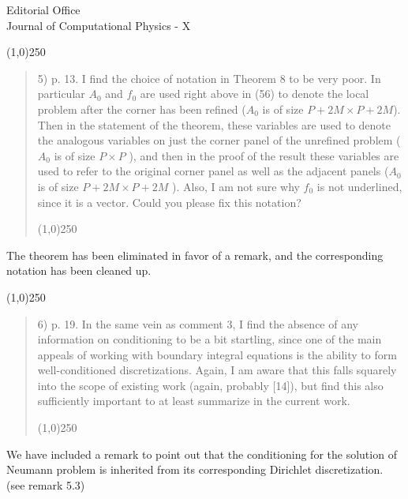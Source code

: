\documentclass[11pt]{letter}
\newcommand\qa{\begin{center}\line(1,0){250}\end{center}\begin{quote}\begin{em}}
\newcommand\qb{\end{em}\begin{center}\line(1,0){250}\end{center}\end{quote}}
\begin{document}
\begin{letter}{Editorial Office\\
Journal of Computational Physics - X}
\qa
5) p. 13. I find the choice of notation in Theorem 8 to be very poor. In particular $A_{0}$ and $f_{0}$ are
used right above in (56) to denote the local problem after the corner has been refined ($A_{0}$ is of size
$P + 2M \times P + 2M$). Then in the statement of the theorem, these variables are used to denote the
analogous variables on just the corner panel of the unrefined problem ($A_{0}$ is of size $P \times P$ ), and then
in the proof of the result these variables are used to refer to the original corner panel as well as the
adjacent panels ($A_{0}$ is of size $P + 2M \times P + 2M$ ). Also, I am not sure why $f_{0}$ is not underlined, since it is a vector. Could you please fix this notation?

\qb

The theorem has been eliminated in favor of a remark, and the corresponding notation has been cleaned up.

\qa
6) p. 19. In the same vein as comment 3, I find the absence of any information on conditioning to be a bit startling, since one of the main appeals of working with boundary integral equations is the ability
to form well-conditioned discretizations. Again, I am aware that this falls squarely into the scope of existing work (again, probably [14]), but find this also sufficiently important to at least summarize in the current work.

\qb
We have included a remark to point out that the conditioning for the solution of Neumann problem is inherited from its corresponding Dirichlet discretization. (see remark 5.3)


\end{letter}
\end{document}
